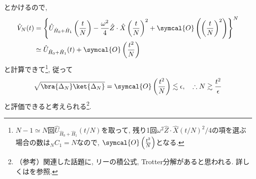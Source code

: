 とかけるので, 
\begin{align*}
  \hat{V}_N(t)&=\left\{  \hat{U}_{\hat{H}_0+\hat{H}_1}\left(\frac{t}{N}\right)-\frac{\omega^2}{4}\hat{Z}\cdot\hat{X}\left( \frac{t}{N} \right)^2+\symcal{O}\left(  \left( \frac{t}{N} \right)^2\right)\right\}^N\\
  &\simeq\hat{U}_{\hat{H}_0+\hat{H}_1}(t)+\symcal{O}\left( \frac{t^2}{N} \right)
\end{align*}
と計算できて\footnote{$N-1\simeq N$回$\hat{U}_{\hat{H}_0+\hat{H}_1}(t/N)$を取って, 残り1回$\omega^2 \hat{Z}\cdot\hat{X}(t/N)^2/4$の項を選ぶ場合の数は${}_N C_1=N$なので, $\symcal{O}\left( \frac{t^2}{N} \right)$となる. }, 従って
\begin{equation}
  \sqrt{\bra{\Delta_N}\ket{\Delta_N}}=\symcal{O}\left( \frac{t^2}{N} \right)\lesssim \epsilon, \quad\therefore N\gtrsim \frac{t^2}{\epsilon}
\end{equation} 
と評価できると考えられる\footnote{（参考）関連した話題に, リーの積公式, Trotter分解があると思われる. 詳しくは\cite{naoto shiraishi}を参照. }. 








